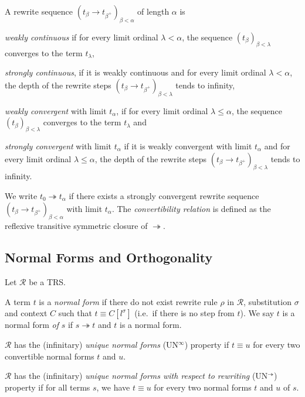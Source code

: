 \begin{definition}%
A rewrite sequence $(t_\beta \rightarrow t_{\beta^+})_{\beta < \alpha}$ of
length $\alpha$ is
\begin{compactenum}
  \item
    \emph{weakly continuous} if for every limit ordinal $\lambda < \alpha$,
    the sequence $(t_\beta)_{\beta < \lambda}$ converges to the term
    $t_\lambda$,
  \item
    \emph{strongly continuous}, if it is weakly continuous and for every limit
    ordinal $\lambda < \alpha$, the depth of the rewrite steps $(t_\beta
    \rightarrow t_{\beta^+})_{\beta < \lambda}$ tends to infinity,
  \item
    \emph{weakly convergent} with limit $t_\alpha$, if for every limit ordinal
    $\lambda \leq \alpha$, the sequence $(t_\beta)_{\beta < \lambda}$
    converges to the term $t_\lambda$ and
  \item
    \emph{strongly convergent} with limit $t_\alpha$ if it is weakly
    convergent with limit $t_\alpha$ and for every limit ordinal $\lambda \leq
    \alpha$, the depth of the rewrite steps $(t_\beta \rightarrow
    t_{\beta^+})_{\beta < \lambda}$ tends to infinity.
\end{compactenum}
\end{definition}

We write $t_0 \twoheadrightarrow t_\alpha$ if there exists a strongly
convergent rewrite sequence $(t_\beta \rightarrow t_{\beta^+})_{\beta
  < \alpha}$ with limit $t_\alpha$. The \emph{convertibility relation}
is defined as the reflexive transitive symmetric closure of
$\twoheadrightarrow$.


\subsection{Normal Forms and Orthogonality}

\begin{definition}\label{def:normalization}%
  Let $\mathcal{R}$ be a TRS.
  \begin{compactenum}
    \item
      A term $t$ is a \emph{normal form} if there do not exist rewrite
      rule $\rho$ in $\mathcal{R}$, substitution $\sigma$ and context
      $C$ such that $t \equiv C[l^\sigma]$ (i.e.\ if there is no step
      from $t$). We say $t$ is a normal form \emph{of} $s$ if $s
      \twoheadrightarrow t$ and $t$ is a normal form.
    \item
      $\mathcal{R}$ has the (infinitary) \emph{unique normal forms}
      (UN$^\infty$) property if $t \equiv u$ for every two
      convertible normal forms $t$ and $u$.
    \item
      $\mathcal{R}$ has the (infinitary) \emph{unique normal forms
      with respect to rewriting} (UN$^\twoheadrightarrow$) property if
      for all terms $s$, we have $t \equiv u$ for every two normal
      forms $t$ and $u$ of $s$.
  \end{compactenum}
\end{definition}

